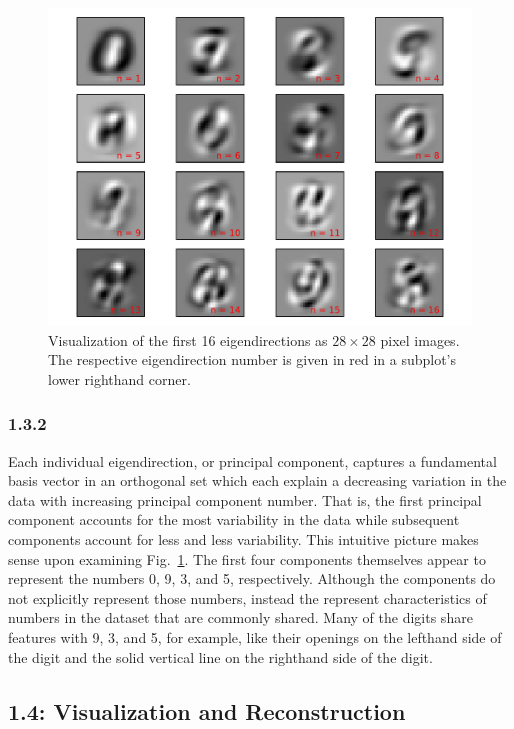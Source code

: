 \documentclass[12pt]{amsart}
\begin{document}
\begin{figure}[H]
	\includegraphics[width=\columnwidth]{eigendirections.pdf}
    \caption{Visualization of the first 16 eigendirections as $28 \times 28$ pixel images.  The respective eigendirection number is given in red in a subplot's lower righthand corner.}
    \label{fig:eigendirections}
\end{figure}

\subsubsection*{1.3.2}

Each individual eigendirection, or principal component, captures a fundamental basis vector in an orthogonal set which each explain a decreasing variation in the data with increasing principal component number.  That is, the first principal component accounts for the most variability in the data while subsequent components account for less and less variability.  This intuitive picture makes sense upon examining Fig.~\ref{fig:eigendirections}.  The first four components themselves appear to represent the numbers 0, 9, 3, and 5, respectively.  Although the components do not explicitly represent those numbers, instead the represent characteristics of numbers in the dataset that are commonly shared.  Many of the digits share features with 9, 3, and 5, for example, like their openings on the lefthand side of the digit and the solid vertical line on the righthand side of the digit.

\subsection*{1.4: Visualization and Reconstruction}
\end{document}
